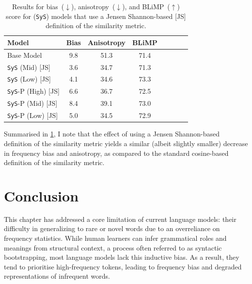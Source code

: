 \begin{table}[ht!]
\centering
\small
\begin{tabular}{l||cc|ccccc}
\toprule
\textbf{Model}  &  \textbf{Bias}  & \textbf{Anisotropy} & \textbf{BLiMP} \\
\midrule
Base Model & 9.8 & 51.3 & 71.4  \\
\midrule
\texttt{SyS} (Mid) \hspace{0.42cm} [JS]  & 3.6 & 34.7 & 71.3 \\
\texttt{SyS} (Low) \hspace{0.38cm} [JS]  & 4.1 & 34.6 & 73.3  \\
\texttt{SyS}-P (High) \hspace{0.05cm} [JS] & 6.6 & 36.7  & 72.5  \\ 
\texttt{SyS}-P (Mid) \hspace{0.15cm} [JS] & 8.4 & 39.1 &  73.0 \\ 
\texttt{SyS}-P (Low) \hspace{0.12cm} [JS] & 5.0 &  34.5 & 72.9 \\ 
\bottomrule
\end{tabular}
\caption{\label{tbl:jsd-similarity-metric-results}
Results for bias~($\downarrow$), anisotropy~($\downarrow$), and BLiMP~($\uparrow$) score for \smoothing (\texttt{SyS}) models that use a Jensen Shannon-based [JS] definition of the similarity metric.}
\end{table}

Summarised in \cref{tbl:jsd-similarity-metric-results}, I note that the effect of using a Jensen Shannon-based definition of the similarity metric yields a similar (albeit slightly smaller) decrease in frequency bias and anisotropy, as compared to the standard cosine-based definition of the similarity metric.   

\section{Conclusion}
\label{sec:conclusion}

This chapter has addressed a core limitation of current language models: their difficulty in generalizing to rare or novel words due to an overreliance on frequency statistics. While human learners can infer grammatical roles and meanings from structural context, a process often referred to as syntactic bootstrapping, most language models lack this inductive bias. As a result, they tend to prioritise high-frequency tokens, leading to frequency bias and degraded representations of infrequent words.

